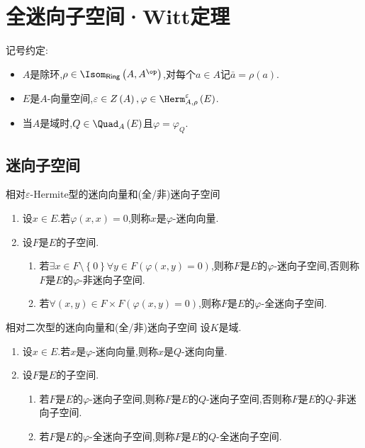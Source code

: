 \chapter{全迷向子空间·Witt定理}

记号约定:
\begin{itemize}
	\item $A$是除环,$\rho\in\Isom_{\mathsf{Ring}}\left(A,A^{\op}\right)$,对每个$a\in A$记$\bar{a}=\rho\left(a\right)$.
	\item $E$是$A$-向量空间,$\varepsilon\in Z\left(A\right),\varphi\in\Herm_{A,\rho}^{\varepsilon}\left(E\right)$.
	\item 当$A$是域时,$Q\in\Quad_{A}\left(E\right)$且$\varphi=\varphi_{Q}$.
\end{itemize}

\section{迷向子空间}

\begin{definition}{相对$\varepsilon$-Hermite型的迷向向量和(全/非)迷向子空间}{}
	\begin{enumerate}
		\item 设$x\in E$.若$\varphi\left(x,x\right)=0$,则称$x$是$\varphi$-迷向向量.
		\item 设$F$是$E$的子空间.
		\begin{enumerate}
			\item 若$\exists x\in F\setminus\left\{0\right\}\forall y\in F\left(\varphi\left(x,y\right)=0\right)$,则称$F$是$E$的$\varphi$-迷向子空间,否则称$F$是$E$的$\varphi$-非迷向子空间.
			\item 若$\forall\left(x,y\right)\in F\times F\left(\varphi\left(x,y\right)=0\right)$,则称$F$是$E$的$\varphi$-全迷向子空间.
		\end{enumerate}
	\end{enumerate}
\end{definition}

\begin{definition}{相对二次型的迷向向量和(全/非)迷向子空间}{}
	设$K$是域.
	\begin{enumerate}
		\item 设$x\in E$.若$x$是$\varphi$-迷向向量,则称$x$是$Q$-迷向向量.
		\item 设$F$是$E$的子空间.
		\begin{enumerate}
			\item 若$F$是$E$的$\varphi$-迷向子空间,则称$F$是$E$的$Q$-迷向子空间,否则称$F$是$E$的$Q$-非迷向子空间.
			\item 若$F$是$E$的$\varphi$-全迷向子空间,则称$F$是$E$的$Q$-全迷向子空间.
		\end{enumerate}
	\end{enumerate}
\end{definition}

